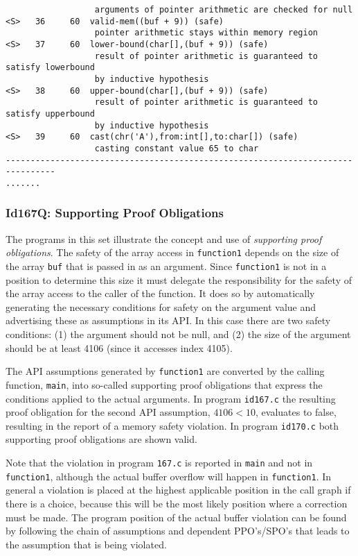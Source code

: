 \documentclass[11pt]{article}
\begin{document}
\begin{scriptsize}
\begin{verbatim}
                  arguments of pointer arithmetic are checked for null
<S>   36     60  valid-mem((buf + 9)) (safe)
                  pointer arithmetic stays within memory region
<S>   37     60  lower-bound(char[],(buf + 9)) (safe)
                  result of pointer arithmetic is guaranteed to satisfy lowerbound 
                  by inductive hypothesis
<S>   38     60  upper-bound(char[],(buf + 9)) (safe)
                  result of pointer arithmetic is guaranteed to satisfy upperbound 
                  by inductive hypothesis
<S>   39     60  cast(chr('A'),from:int[],to:char[]) (safe)
                  casting constant value 65 to char
--------------------------------------------------------------------------------
.......
\end{verbatim}
\end{scriptsize}

\subsubsection{Id167Q: Supporting Proof Obligations}

The programs in this set illustrate the concept and use of \emph{supporting proof obligations}.
The safety of the array access in {\tt function1} depends on the size of the array {\tt buf} 
that is passed in as an argument. Since {\tt function1} is not in a position to determine 
this size it must delegate the responsibility for the safety of the array access to 
the caller of the function. It does so by automatically generating the necessary 
conditions for safety on the argument value and advertising these as assumptions in 
its API. In this case there are two safety conditions: (1) the argument should not 
be null, and (2) the size of the argument should be at least 4106 (since it 
accesses index 4105).

The API assumptions generated by {\tt function1} are converted by the calling function, 
{\tt main}, into so-called supporting proof obligations that express the conditions 
applied to the actual arguments. In program {\tt id167.c} the resulting proof obligation 
for the second API assumption, $4106 < 10$, evaluates to false, resulting in the 
report of a memory safety violation. In program {\tt id170.c} both supporting proof 
obligations are shown valid.

Note that the violation in program {\tt 167.c} is reported in {\tt main} and not in {\tt function1}, 
although the actual buffer overflow will happen in {\tt function1}. In general a 
violation is placed at the highest applicable position in the call graph if there 
is a choice, because this will be the most likely position where a correction 
must be made. The program position of the actual buffer violation can be 
found by following the chain of assumptions and dependent PPO's/SPO's that 
leads to the assumption that is being violated.
\end{document}
